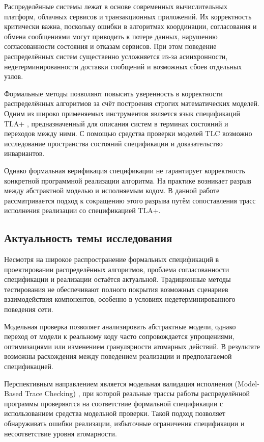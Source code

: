 \introduction %

Распределённые системы лежат в основе современных вычислительных платформ,
облачных сервисов и транзакционных приложений. Их корректность критически
важна, поскольку ошибки в алгоритмах координации, согласования и обмена
сообщениями могут приводить к потере данных, нарушению согласованности
состояния и отказам сервисов. При этом поведение распределённых систем
существенно усложняется из-за асинхронности, недетерминированности доставки
сообщений и возможных сбоев отдельных узлов.

Формальные методы позволяют повысить уверенность в корректности распределённых
алгоритмов за счёт построения строгих математических моделей. Одним из широко
применяемых инструментов является язык спецификаций TLA+
\cite{lamport2002specifying}, предназначенный для описания систем в терминах
состояний и переходов между ними. С помощью средства проверки моделей TLC
возможно исследование пространства состояний спецификации и доказательство
инвариантов.

Однако формальная верификация спецификации не гарантирует корректность
конкретной программной реализации алгоритма. На практике возникает разрыв между
абстрактной моделью и исполняемым кодом. В данной работе рассматривается подход
к сокращению этого разрыва путём сопоставления трасс исполнения реализации со
спецификацией TLA+.

\subsection*{Актуальность темы исследования}

Несмотря на широкое распространение формальных спецификаций в проектировании
распределённых алгоритмов, проблема согласованности спецификации и реализации
остаётся актуальной. Традиционные методы тестирования не обеспечивают полного
покрытия возможных сценариев взаимодействия компонентов, особенно в условиях
недетерминированного поведения сети.

Модельная проверка позволяет анализировать абстрактные модели, однако переход
от модели к реальному коду часто сопровождается упрощениями, оптимизациями или
изменением гранулярности атомарных действий. В результате возможны расхождения
между поведением реализации и предполагаемой спецификацией.

Перспективным направлением является модельная валидация исполнения (Model-Based
Trace Checking) \cite{howard2011tracechecking}, при которой реальные трассы
работы распределённой программы проверяются на соответствие формальной
спецификации с использованием средства модельной проверки. Такой подход
позволяет обнаруживать ошибки реализации, избыточные ограничения спецификации и
несоответствие уровня атомарности.

